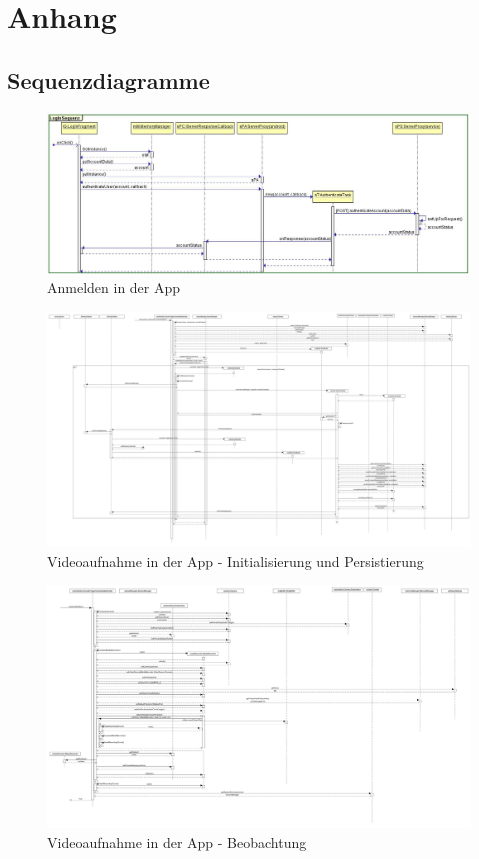 \chapter{Anhang}

\section{Sequenzdiagramme}

\begin{figure}[ht]
	\centering
\includegraphics[width=1\textwidth]{./resources/Diagramme/App/logInSequence.jpg}
\caption{Anmelden in der App}
	\label{fig:AppAuth}
\end{figure}

\begin{figure}[ht]
	\centering
\includegraphics[width=1\textwidth]{./resources/Diagramme/App/recordSequenceA.jpg}
\caption{Videoaufnahme in der App - Initialisierung und Persistierung}
	\label{fig:AppVideo}
\end{figure}

\begin{figure}[ht]
	\centering
\includegraphics[width=1\textwidth]{./resources/Diagramme/App/recordSequenceB.jpg}
\caption{Videoaufnahme in der App - Beobachtung}
	\label{fig:AppVideo}
\end{figure}

